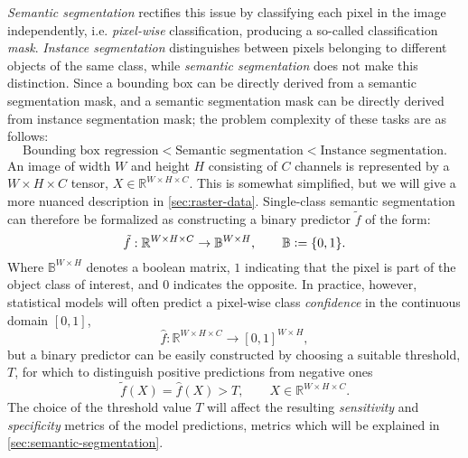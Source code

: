\textit{Semantic segmentation} rectifies this issue by classifying each pixel in the image independently, i.e. \textit{pixel-wise} classification, producing a so-called classification \textit{mask}.
\textit{Instance segmentation} distinguishes between pixels belonging to different objects of the same class, while \textit{semantic segmentation} does not make this distinction.
Since a bounding box can be directly derived from a semantic segmentation mask, and a semantic segmentation mask can be directly derived from instance segmentation mask; the problem complexity of these tasks are as follows:
%
\begin{equation*}
  \text{Bounding box regression}
  <
  \text{Semantic segmentation}
  <
  \text{Instance segmentation}.
\end{equation*}
%
An image of width $W$ and height $H$ consisting of $C$ channels is represented by a $W \times H \times C$ tensor, $X \in \mathbb{R}^{W \times H \times C}$.
This is somewhat simplified, but we will give a more nuanced description in \cref{sec:raster-data}.
Single-class semantic segmentation can therefore be formalized as constructing a binary predictor $\tilde{f}$ of the form:
%
\begin{equation*}
  \tilde{f}: \mathbb{R}^{W \times H \times C} \rightarrow \mathbb{B}^{W \times H}, \hspace{2em} \mathbb{B} \vcentcolon= \{0, 1\}.
\end{equation*}
%
Where $\mathbb{B}^{W \times H}$ denotes a boolean matrix, $1$ indicating that the pixel is part of the object class of interest, and $0$ indicates the opposite.
In practice, however, statistical models will often predict a pixel-wise class \textit{confidence} in the continuous domain $[0, 1]$,
%
\begin{equation*}
  \hat{f}: \mathbb{R}^{W \times H \times C} \rightarrow {[0, 1]}^{W \times H},
\end{equation*}
%
but a binary predictor can be easily constructed by choosing a suitable threshold, $T$, for which to distinguish positive predictions from negative ones
%
\begin{equation*}
  \tilde{f}(X) = \hat{f}(X) > T, \hspace{2em} X \in \mathbb{R}^{W \times H \times C}.
\end{equation*}
%
The choice of the threshold value $T$ will affect the resulting \textit{sensitivity} and \textit{specificity} metrics of the model predictions, metrics which will be explained in \cref{sec:semantic-segmentation}.

